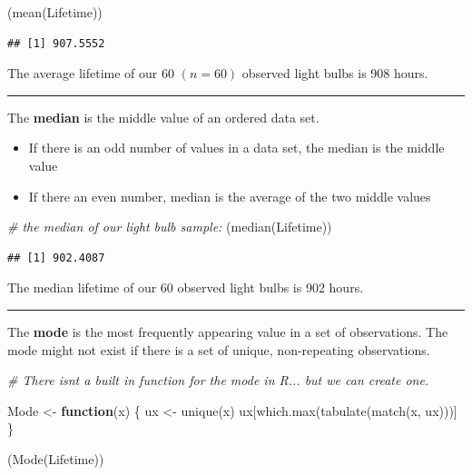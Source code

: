 \documentclass[
]{book}
\newenvironment{Shaded}{\begin{snugshade}}{\end{snugshade}}
\newcommand{\CommentTok}[1]{\textcolor[rgb]{0.56,0.35,0.01}{\textit{#1}}}
\newcommand{\ControlFlowTok}[1]{\textcolor[rgb]{0.13,0.29,0.53}{\textbf{#1}}}
\newcommand{\FunctionTok}[1]{\textcolor[rgb]{0.00,0.00,0.00}{#1}}
\newcommand{\NormalTok}[1]{#1}
\newcommand{\OtherTok}[1]{\textcolor[rgb]{0.56,0.35,0.01}{#1}}
\begin{document}
\begin{Shaded}
\begin{Highlighting}[]
\NormalTok{(}\FunctionTok{mean}\NormalTok{(Lifetime))}
\end{Highlighting}
\end{Shaded}

\begin{verbatim}
## [1] 907.5552
\end{verbatim}

The average lifetime of our 60 \((n=60)\) observed light bulbs is 908 hours.

\begin{center}\rule{0.5\linewidth}{0.5pt}\end{center}

The \textbf{median} is the middle value of an ordered data set.

\begin{itemize}
\item
  If there is an odd number of values in a data set, the median is the middle value
\item
  If there an even number, median is the average of the two middle values
\end{itemize}

\begin{Shaded}
\begin{Highlighting}[]
\CommentTok{\# the median of our light bulb sample:}
\NormalTok{(}\FunctionTok{median}\NormalTok{(Lifetime))}
\end{Highlighting}
\end{Shaded}

\begin{verbatim}
## [1] 902.4087
\end{verbatim}

The median lifetime of our 60 observed light bulbs is 902 hours.

\begin{center}\rule{0.5\linewidth}{0.5pt}\end{center}

The \textbf{mode} is the most frequently appearing value in a set of observations. The mode might not exist if there is a set of unique, non-repeating observations.

\begin{Shaded}
\begin{Highlighting}[]
\CommentTok{\# There isn\textquotesingle{}t a built in function for the mode in R... but we can create one.}

\NormalTok{Mode }\OtherTok{\textless{}{-}} \ControlFlowTok{function}\NormalTok{(x) \{}
\NormalTok{  ux }\OtherTok{\textless{}{-}} \FunctionTok{unique}\NormalTok{(x)}
\NormalTok{  ux[}\FunctionTok{which.max}\NormalTok{(}\FunctionTok{tabulate}\NormalTok{(}\FunctionTok{match}\NormalTok{(x, ux)))]}
\NormalTok{\}}

\NormalTok{(}\FunctionTok{Mode}\NormalTok{(Lifetime))}
\end{Highlighting}
\end{Shaded}
\end{document}
